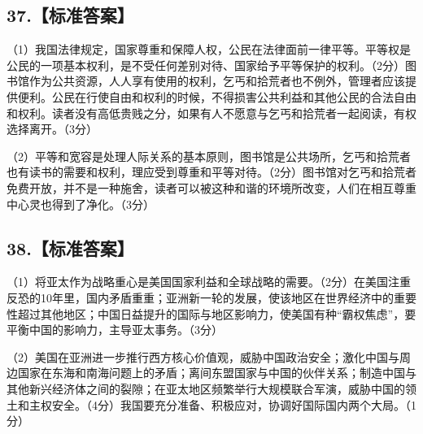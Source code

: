 \documentclass[UTF8,11pt]{ctexart}
\begin{document}
\subsection*{37.【标准答案】}

（1）我国法律规定，国家尊重和保障人权，公民在法律面前一律平等。平等权是公民的一项基本权利，是不受任何差别对待、国家给予平等保护的权利。（2分）图书馆作为公共资源，人人享有使用的权利，乞丐和拾荒者也不例外，管理者应该提供便利。公民在行使自由和权利的时候，不得损害公共利益和其他公民的合法自由和权利。读者没有高低贵贱之分，如果有人不愿意与乞丐和拾荒者一起阅读，有权选择离开。（3分）


（2）平等和宽容是处理人际关系的基本原则，图书馆是公共场所，乞丐和拾荒者也有读书的需要和权利，理应受到尊重和平等对待。（2分）图书馆对乞丐和拾荒者免费开放，并不是一种施舍，读者可以被这种和谐的环境所改变，人们在相互尊重中心灵也得到了净化。（3分）


\subsection*{38.【标准答案】}

（1）将亚太作为战略重心是美国国家利益和全球战略的需要。（2分）在美国注重反恐的10年里，国内矛盾重重；亚洲新一轮的发展，使该地区在世界经济中的重要性超过其他地区；中国日益提升的国际与地区影响力，使美国有种“霸权焦虑”，要平衡中国的影响力，主导亚太事务。（3分）


（2）美国在亚洲进一步推行西方核心价值观，威胁中国政治安全；激化中国与周边国家在东海和南海问题上的矛盾；离间东盟国家与中国的伙伴关系；制造中国与其他新兴经济体之间的裂隙；在亚太地区频繁举行大规模联合军演，威胁中国的领土和主权安全。（4分）我国要充分准备、积极应对，协调好国际国内两个大局。（1分）
\end{document}
